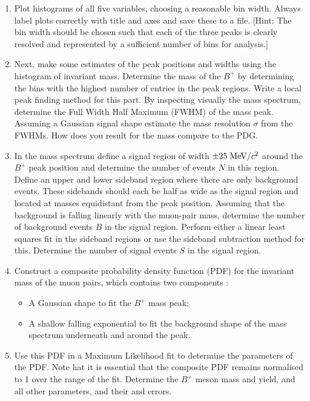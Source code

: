 \begin{enumerate}

\item Plot histograms of all five variables, choosing a reasonable bin width. Always label plots correctly with title and axes and save these to a file. [Hint: The bin width should be chosen such that each of the three peaks is clearly resolved and represented by a sufficient number of bins for analysis.]

\item Next, make some estimates of the peak positions and widths using the histogram of invariant mass.  Determine the mass of the $B^+$  by determining the bins with the highest number of entries in the peak regions. Write a local peak finding method for this part. By inspecting visually the mass spectrum, determine the Full Width Half Maximum (FWHM) of the mass peak. Assuming a Gaussian signal shape estimate the mass resolution $\sigma$ from the FWHMs. How does you result for the mass compare to the PDG.

\item In the  mass spectrum define a signal region of width $\pm 25\; {\rm MeV}/c^2$ around the $B^+$  peak position and determine the number of events $N$ in this region.
  Define an upper and lower sideband region where there are only background events. These sidebands should each be half as wide as the signal region and located at masses equidistant from the peak position. Assuming that the background is falling linearly with the muon-pair mass, determine the number of background events $B$ in the signal region. Perform either a linear least squares fit in the sideband regions or use the sideband subtraction method for this. Determine the number of signal events $S$ in the signal region.

\item Construct a composite probability density
function (PDF) for the invariant mass of the muon pairs, which
contains two components : 
\begin{itemize}
\item A Gaussian shape to fit the  $B^+$ mass peak;
\item A shallow falling exponential to fit the background shape of the mass spectrum underneath and around the peak.
\end{itemize}

\item	Use this PDF in a Maximum Likelihood fit to determine the parameters of the PDF. Note hat it is essential that the composite PDF remains normalised to 1 over the range of the fit. Determine the $B^+$ meson mass and yield, and all other parameters, and their and errors.


\end{enumerate}
